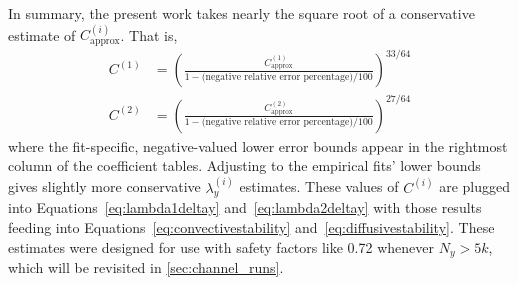 In summary, the present work takes nearly the square root of a conservative
estimate of $C_\text{approx}^{(i)}$.  That is,
\begin{align}
  C^{(1)} &= \left(
      \frac{C_\text{approx}^{(1)}}
           {1 - \text{(negative relative error percentage)}/100}
  \right)^{33/64}
\\
  C^{(2)} &= \left(
      \frac{C_\text{approx}^{(2)}}
           {1 - \text{(negative relative error percentage)}/100}
  \right)^{27/64}
\end{align}
where the fit-specific, negative-valued lower error bounds appear in the
rightmost column of the coefficient tables.  Adjusting to the empirical fits'
lower bounds gives slightly more conservative $\lambda_y^{(i)}$ estimates.  These
values of $C^{(i)}$ are plugged into Equations~\eqref{eq:lambda1deltay}
and~\eqref{eq:lambda2deltay} with those results feeding into
Equations~\eqref{eq:convectivestability} and~\eqref{eq:diffusivestability}.
These estimates were designed for use with safety factors like 0.72 whenever
$N_y > 5k$,  which will be revisited in
\autoref{sec:channel_runs}.


